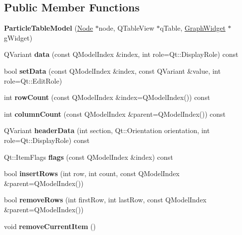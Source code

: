 \subsection*{Public Member Functions}
\begin{DoxyCompactItemize}
\item 
\mbox{\label{class_particle_table_model_a12bd22225423faa1dde59c20a3c27371}} 
{\bfseries Particle\+Table\+Model} (\hyperlink{class_node}{Node} $\ast$node, Q\+Table\+View $\ast$q\+Table, \hyperlink{class_graph_widget}{Graph\+Widget} $\ast$g\+Widget)
\item 
\mbox{\label{class_particle_table_model_a0bc089203e3161521395cfaa106d4b5b}} 
Q\+Variant {\bfseries data} (const Q\+Model\+Index \&index, int role=Qt\+::\+Display\+Role) const
\item 
\mbox{\label{class_particle_table_model_abbb3adc10a6a4bc528e2199804fa1ce9}} 
bool {\bfseries set\+Data} (const Q\+Model\+Index \&index, const Q\+Variant \&value, int role=Qt\+::\+Edit\+Role)
\item 
\mbox{\label{class_particle_table_model_a2eb807db1aac45efd0fad085f33008ea}} 
int {\bfseries row\+Count} (const Q\+Model\+Index \&index=Q\+Model\+Index()) const
\item 
\mbox{\label{class_particle_table_model_a74e02475e8d35e1a2e17b24e1c3f1fa6}} 
int {\bfseries column\+Count} (const Q\+Model\+Index \&parent=Q\+Model\+Index()) const
\item 
\mbox{\label{class_particle_table_model_a2be04da8fc2efe922d561d8dcb4886d7}} 
Q\+Variant {\bfseries header\+Data} (int section, Qt\+::\+Orientation orientation, int role=Qt\+::\+Display\+Role) const
\item 
\mbox{\label{class_particle_table_model_a11b583b918ebe27bf266248baf52e636}} 
Qt\+::\+Item\+Flags {\bfseries flags} (const Q\+Model\+Index \&index) const
\item 
\mbox{\label{class_particle_table_model_a03a62a2dee78c06c60d5d54bb5c6e10b}} 
bool {\bfseries insert\+Rows} (int row, int count, const Q\+Model\+Index \&parent=Q\+Model\+Index())
\item 
\mbox{\label{class_particle_table_model_adb86e6897c58100e257973dc69be3a74}} 
bool {\bfseries remove\+Rows} (int first\+Row, int last\+Row, const Q\+Model\+Index \&parent=Q\+Model\+Index())
\item 
\mbox{\label{class_particle_table_model_a199e4cdc73de6bc1c571319f0d5412a6}} 
void {\bfseries remove\+Current\+Item} ()
\end{DoxyCompactItemize}


